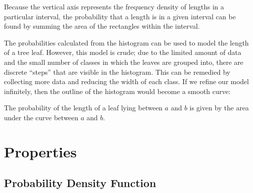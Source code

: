 Because the vertical axis represents the frequency density of lengths in a particular interval, the probability that a length is in a given interval can be found by summing the area of the rectangles within the interval.

The probabilities calculated from the histogram can be used to model the length of a tree leaf. However, this model is crude; due to the limited amount of data and the small number of classes in which the leaves are grouped into, there are discrete ``steps'' that are visible in the histogram. This can be remedied by collecting more data and reducing the width of each class. If we refine our model infinitely, then the outline of the histogram would become a smooth curve:

\begin{figure}[H]
    \centering
    \caption{}
\end{figure}

The probability of the length of a leaf lying between $a$ and $b$ is given by the area under the curve between $a$ and $b$.

\section{Properties}

\subsection{Probability Density Function}

